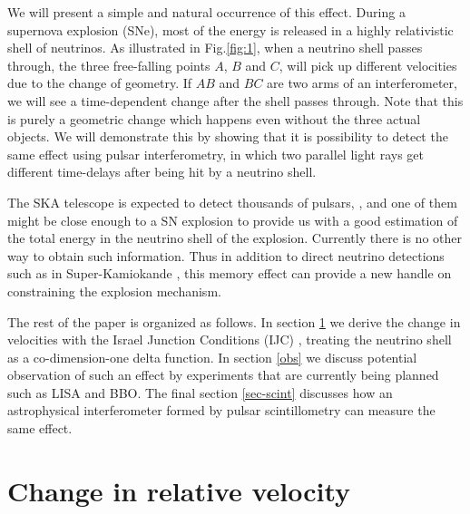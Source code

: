 \documentclass[aps,showpacs,onecolumn,floats,prd,superscriptaddress,nofootinbib]{revtex4-1}
\begin{document}
We will present a simple and natural occurrence of this effect. During a supernova explosion (SNe), most of the energy is released in a highly relativistic shell of neutrinos. As illustrated in Fig.\ref{fig:1}, when a neutrino shell passes through, the three free-falling points $A$, $B$ and $C$, will pick up different velocities due to the change of geometry. If $AB$ and $BC$ are two arms of an interferometer, we will see a time-dependent change after the shell passes through. Note that this is purely a geometric change which happens even without the three actual objects. We will demonstrate this by showing that it is possibility to detect the same effect using pulsar interferometry, in which two parallel light rays get different time-delays after being hit by a neutrino shell. 

The SKA telescope is expected to detect thousands of pulsars, \cite{MSPpopulation}, and one of them might be close enough to a SN explosion to provide us with a good estimation of the total energy in the neutrino shell of the explosion. Currently there is no other way to obtain such information. Thus in addition to direct neutrino detections such as in Super-Kamiokande \cite{SuperKSN}, this memory effect can provide a new handle on constraining the explosion mechanism. 

The rest of the paper is organized as follows. In section \ref{RelV} we derive the change in velocities with the Israel Junction Conditions (IJC) \cite{Isr66}, treating the neutrino shell as a co-dimension-one delta function. In section \ref{obs} we discuss potential observation of such an effect by experiments that are currently being planned such as LISA and BBO. The final section \ref{sec-scint} discusses how an astrophysical interferometer formed by pulsar scintillometry can measure the same effect.

\section{Change in relative velocity}
\label{RelV}
\end{document}
